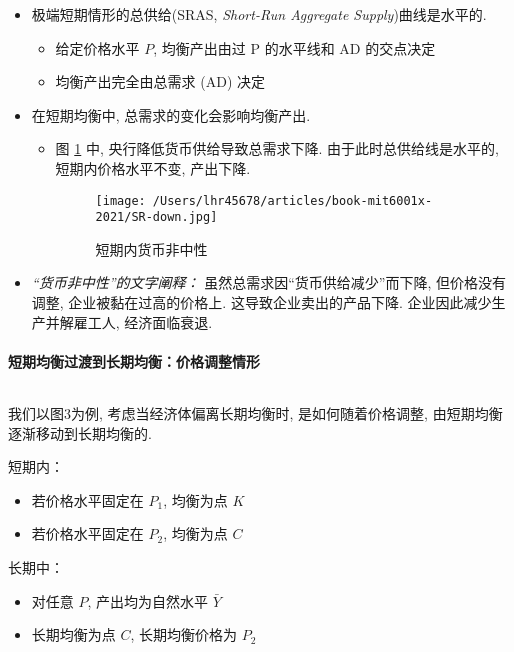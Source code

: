 \documentclass[10pt]{ctexart}
\begin{document}
\begin{itemize}
\item
  极端短期情形的总供给(SRAS,  \textit{Short-Run Aggregate Supply})曲线是水平的.
  \begin{itemize}
  \item
    给定价格水平 $P$, 均衡产出由过 P 的水平线和 AD 的交点决定
  \item
    均衡产出完全由总需求 (AD) 决定
  \end{itemize}
\item
  在短期均衡中, 总需求的变化会影响均衡产出. 

  \begin{itemize}
  \item
    图 \ref{fig:sr} 中, 央行降低货币供给导致总需求下降. 由于此时总供给线是水平的, 短期内价格水平不变, 产出下降.
  
  \begin{figure}[H]
\centering
\texttt{[image: /Users/lhr45678/articles/book-mit6001x-2021/SR-down.jpg]}
\caption{短期内货币非中性}
\label{fig:sr}
\end{figure} 
  \end{itemize}
  
  \item
    \textit{``货币非中性''的文字阐释：} 虽然总需求因``货币供给减少''而下降, 但价格没有调整, 企业被黏在过高的价格上. 这导致企业卖出的产品下降. 企业因此减少生产并解雇工人, 经济面临衰退.   
\end{itemize}



\paragraph{短期均衡过渡到长期均衡：价格调整情形} $\, $

我们以图3为例, 考虑当经济体偏离长期均衡时, 是如何随着价格调整, 由短期均衡逐渐移动到长期均衡的. 

短期内：

\begin{itemize}
  \item
    若价格水平固定在 \(P_1\),  均衡为点 \(K\)
  \item
    若价格水平固定在 \(P_2\),  均衡为点 \(C\)
\end{itemize}

长期中：

  \begin{itemize}
  \item
    对任意 \(P\), 产出均为自然水平 \(\bar Y\)
  \item 长期均衡为点 \(C\), 
    长期均衡价格为 \(P_2\)
  \end{itemize}
\end{document}
